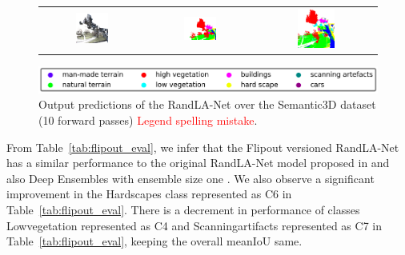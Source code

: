 \begin{figure}[h!]
\begin{tabular}{ccc}
            \includegraphics[width=0.33\textwidth, height=0.18\textheight]{images/seg_output/sem3d_seg_output/3_RGB.pdf} &
            \includegraphics[width=0.33\textwidth, height=0.18\textheight]{images/seg_output/sem3d_seg_output/3_GT.pdf}& 
            \includegraphics[width=0.33\textwidth, height=0.18\textheight]{images/seg_output/flipout/sem3d_3.pdf}\\
        \end{tabular}
        \includegraphics[scale=0.45]{images/legend.png}
        \caption{Output predictions of the RandLA-Net over the Semantic3D dataset (10 forward passes) \textcolor{red}{Legend spelling mistake}.}
        \label{fig:flipout_vis_sem3d}
    \end{figure}   

    From Table~\ref{tab:flipout_eval}, we infer that the Flipout versioned RandLA-Net has a similar performance to the original RandLA-Net model proposed in \cite{Hu_2020_CVPR_Randla} and also Deep Ensembles with ensemble size one .
    We also observe a significant improvement in the Hardscapes class represented as C6 in Table~\ref{tab:flipout_eval}.
    There is a decrement in performance of classes Lowvegetation represented as C4 and Scanningartifacts represented as C7 in Table~\ref{tab:flipout_eval}, keeping the overall meanIoU same.
    
